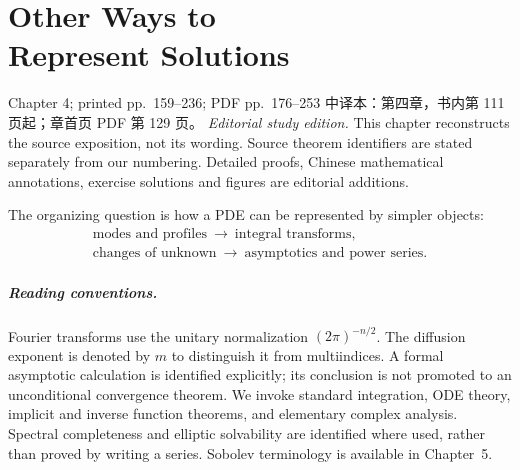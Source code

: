 \chapter[Other Ways to Represent Solutions]{Other Ways to\\Represent Solutions}
\label{chap:other-ways-to-represent-solutions}
\PDESource
 {Chapter 4; printed pp.~159--236; PDF pp.~176--253}
 {中译本：第四章，书内第 111 页起；章首页 PDF 第 129 页。}
\noindent\emph{Editorial study edition.}
This chapter reconstructs the source exposition, not its wording.
Source theorem identifiers are stated separately from our numbering.
Detailed proofs, Chinese mathematical annotations, exercise solutions
and figures are editorial additions.

The organizing question is how a PDE can be represented by simpler objects:
\[
 \begin{gathered}
 \text{modes and profiles}\ \longrightarrow\ \text{integral transforms},\\
 \text{changes of unknown}\ \longrightarrow\ \text{asymptotics and power series}.
 \end{gathered}
\]
\Needspace{45mm}
\paragraph{Reading conventions.}
Fourier transforms use the unitary normalization $(2\pi)^{-n/2}$.
The diffusion exponent is denoted by $m$ to distinguish it from
multiindices. A formal asymptotic calculation is identified explicitly;
its conclusion is not promoted to an unconditional convergence theorem.
We invoke standard integration, ODE theory, implicit and inverse function
theorems, and elementary complex analysis. Spectral completeness and
elliptic solvability are identified where used, rather than proved by
writing a series. Sobolev terminology is available in Chapter~5.
\clearpage








